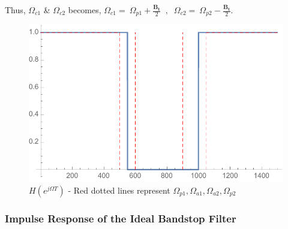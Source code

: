 \documentclass[11pt]{article}
\begin{document}
Thus, $\Omega_{c1}$ \& $\Omega_{c2}$ becomes,
$ \Omega_{c1} =\ \Omega_{p1}+\frac{\mathbf{B_{t}}}{2}$ $\ {\displaystyle ,} \ $
$ \Omega_{c2} =\ \Omega_{p2}-\frac{\mathbf{B_{t}}}{2}$.

\begin{figure}[H]
    \centering
    \includegraphics[scale=0.8]{HW} 
    \caption{$H(e^{j\Omega T})$  - Red dotted lines represent $\Omega_{p1}, \Omega_{a1},\Omega_{a2},\Omega_{p2}$}
    \label{fig:Bandstop}
\end{figure}

\subsubsection{Impulse Response of the Ideal Bandstop Filter}
\end{document}
